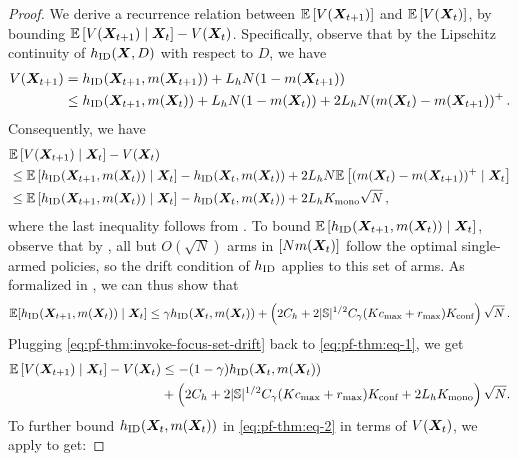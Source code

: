\begin{proof}
We derive a recurrence relation between $\mathbb{E}\left[V({\bm{X}}_{t+1})\right]$ and $\mathbb{E}\left[V({\bm{X}}_t)\right]$, by bounding $\mathbb{E}\left[V({\bm{X}}_{t+1}) \;|\; {\bm{X}}_t\right] - V({\bm{X}}_t)$. Specifically, observe that by the Lipschitz continuity of $h_{\textnormal{ID}}({\bm{X}}, D)$ with respect to $D$, we have
    \begin{align*}
        V({\bm{X}}_{t+1})
        &= h_{\textnormal{ID}}({\bm{X}}_{t+1},m({\bm{X}}_{t+1})) + L_hN(1-m({\bm{X}}_{t+1})) \\
        &\leq h_{\textnormal{ID}}({\bm{X}}_{t+1},m({\bm{X}}_t)) + L_hN(1-m({\bm{X}}_t)) + 2L_hN(m({\bm{X}}_t)-m({\bm{X}}_{t+1}))^+\,.
    \end{align*}
    Consequently, we have
    \begin{align}
        \nonumber
        &\mathbb{E}\left[V({\bm{X}}_{t+1}) \mid {\bm{X}}_t\right]-V({\bm{X}}_t)\\
        \nonumber
        &\leq\mathbb{E}\left[h_{\textnormal{ID}}({\bm{X}}_{t+1},m({\bm{X}}_t)) \mid {\bm{X}}_t\right]- h_{\textnormal{ID}}({\bm{X}}_t,m({\bm{X}}_t)) + 2L_hN\mathbb{E}\left[(m({\bm{X}}_t)-m({\bm{X}}_{t+1}))^+ \mid {\bm{X}}_t\right]\\
        \label{eq:pf-thm:eq-1}
        &\leq \mathbb{E}\left[h_{\textnormal{ID}}({\bm{X}}_{t+1},m({\bm{X}}_t)) \mid {\bm{X}}_t\right]- h_{\textnormal{ID}}({\bm{X}}_t,m({\bm{X}}_t)) + 2L_hK_{\text{mono}}\sqrt{N}\,,
    \end{align}
    where the last inequality follows from . To bound $\mathbb{E}\left[h_{\textnormal{ID}}({\bm{X}}_{t+1},m({\bm{X}}_t)) \mid {\bm{X}}_t\right]$, observe that by , all but $O(\sqrt{N})$ arms in $[Nm({\bm{X}}_t)]$ follow the optimal single-armed policies, so the drift condition of $h_{\textnormal{ID}}$ applies to this set of arms. As formalized in , we can thus show that
    \begin{align}
        \mathbb{E}[h_{\textnormal{ID}}({\bm{X}}_{t+1},m({\bm{X}}_t))\;|\; {\bm{X}}_t ]\leq \gamma h_{\textnormal{ID}}({\bm{X}}_t,m({\bm{X}}_t)) + \left(2C_h+2\lvert\mathbb{S}\rvert^{1/2} C_{\gamma}(Kc_{\max}+r_{\max})K_{\text{conf}}\right)\sqrt{N}\,.\label{eq:pf-thm:invoke-focus-set-drift}
    \end{align}
    Plugging \eqref{eq:pf-thm:invoke-focus-set-drift} back to \eqref{eq:pf-thm:eq-1}, we get 
    \begin{align}
        \mathbb{E}\left[V({\bm{X}}_{t+1}) \mid {\bm{X}}_t\right]-V({\bm{X}}_t)
        \label{eq:pf-thm:eq-2}
        &\leq  -(1-\gamma) h_{\textnormal{ID}}({\bm{X}}_t,m({\bm{X}}_t))  \\
        &+ \left(2C_h+2\lvert\mathbb{S}\rvert^{1/2} C_{\gamma}(Kc_{\max}+r_{\max})K_{\text{conf}} + 2L_hK_{\text{mono}}\right)\sqrt{N}. \nonumber
    \end{align}
    To further bound $h_{\textnormal{ID}}({\bm{X}}_t,m({\bm{X}}_t))$ in \eqref{eq:pf-thm:eq-2} in terms of $V({\bm{X}}_t)$, we apply  to get: 

\end{proof}
